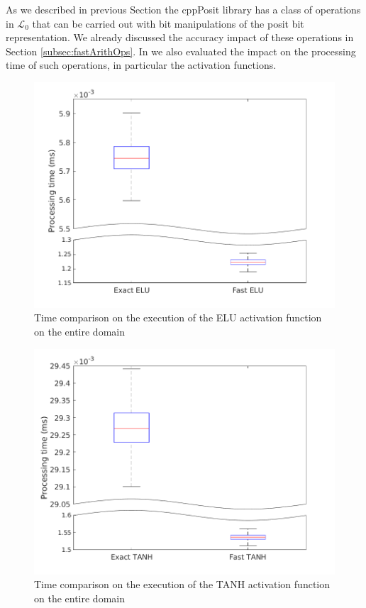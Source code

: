 As we described in previous Section the cppPosit library has a class of operations in $\mathcal{L}_0$ that can be carried out with bit manipulations of the posit bit representation. We already discussed the accuracy impact of these operations in Section \ref{subsec:fastArithOps}. In \cite{coco_et_al_jrtip_2020, coco2020sensors} we also evaluated the impact on the processing time of such operations, in particular the activation functions.

\begin{figure}
    \centering
\includegraphics[width=\linewidth]{img/eluTimeComparison.png}
    \caption{Time comparison on the execution of the ELU activation function on the entire  domain}
    \label{fig:posit80EluTimeComparison}
\end{figure}

\begin{figure}
    \centering
\includegraphics[width=\linewidth]{img/tanhTimeComparison.png}
    \caption{Time comparison on the execution of the TANH activation function on the entire  domain}
    \label{fig:posit80ETanhTimeComparison}
\end{figure}

